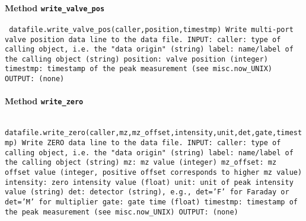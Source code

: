 \paragraph{Method \texttt{write_valve_pos}}
\vspace{1ex}
\texttt{\newline
datafile.write_valve_pos(caller,position,timestmp)\newline
\newline
Write multi-port valve position data line to the data file.\newline
\newline
INPUT:\newline
caller: type of calling object, i.e. the "data origin" (string)\newline
label: name/label of the calling object (string)\newline
position: valve position (integer)\newline
timestmp: timestamp of the peak measurement (see misc.now_UNIX)\newline
\newline
OUTPUT:\newline
(none)\newline
\newline
}

\paragraph{Method \texttt{write_zero}}
\vspace{1ex}
\texttt{\newline
datafile.write_zero(caller,mz,mz_offset,intensity,unit,det,gate,timestmp)\newline
\newline
Write ZERO data line to the data file.\newline
\newline
INPUT:\newline
caller: type of calling object, i.e. the "data origin" (string)\newline
label: name/label of the calling object (string)\newline
mz: mz value (integer)\newline
mz_offset: mz offset value (integer, positive offset corresponds to higher mz value)\newline
intensity: zero intensity value (float)\newline
unit: unit of peak intensity value (string)\newline
det: detector (string), e.g., det='F' for Faraday or det='M' for multiplier\newline
gate: gate time (float)\newline
timestmp: timestamp of the peak measurement (see misc.now_UNIX)\newline
\newline
OUTPUT:\newline
(none)\newline
\newline
}

